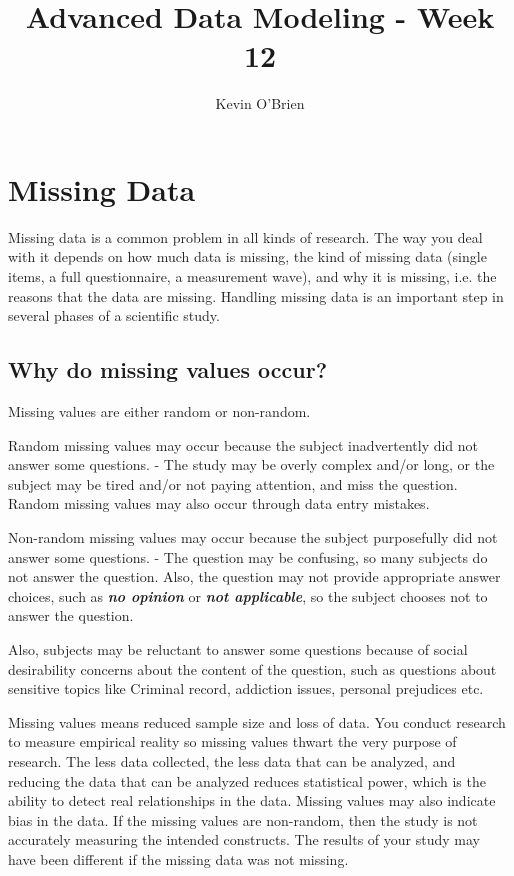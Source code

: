 \documentclass[12pt]{article} %
\title{Advanced Data Modeling - Week 12}
\author{Kevin O'Brien}
\begin{document}
\maketitle
\tableofcontents
\newpage

\newpage

\section{Missing Data}
Missing data is a common problem in all kinds of research. The way you deal with it depends on how
much data is missing, the kind of missing data (single items, a full questionnaire, a measurement
wave), and why it is missing, i.e. the reasons that the data are missing. Handling missing data is an
important step in several phases of a scientific study.

\subsection{Why do missing values occur?}

Missing values are either random or non-random.

Random missing values may occur because the subject inadvertently did not answer some questions.  - The study may be overly complex and/or long, or the subject may be tired and/or not paying attention, and miss the question. Random missing values may also occur through data entry mistakes.

Non-random missing values may occur because the subject purposefully did not answer some questions.  - The question may be confusing, so many subjects do not answer the question. Also, the question may not provide appropriate answer choices, such as \textbf{\textit{no opinion}} or \textit{\textbf{not applicable}}, so the subject chooses not to answer the question.

Also, subjects may be reluctant to answer some questions because of social desirability concerns about the content of the question, such as questions about sensitive topics like Criminal record, addiction issues, personal prejudices etc.

Missing values means reduced sample size and loss of data. You conduct research to measure empirical reality so missing values thwart the very purpose of research. The less data collected, the less data that can be analyzed, and reducing the data that can be analyzed reduces statistical power, which is the ability to detect real relationships in the data. Missing values may also indicate bias in the data. If the missing values are non-random, then the study is not accurately measuring the intended constructs. The results of your study may have been different if the missing data was not missing.
\end{document}
